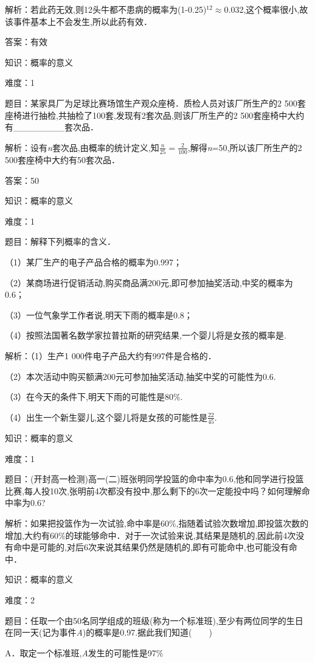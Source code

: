\documentclass{article} %
\begin{document}
解析：若此药无效,则12头牛都不患病的概率为(1-0.25)${}^{12}$$\mathrm{\approx}$0.032,这个概率很小,故该事件基本上不会发生,所以此药有效．

答案：有效

知识：概率的意义

难度：1

题目：某家具厂为足球比赛场馆生产观众座椅．质检人员对该厂所生产的2 500套座椅进行抽检,共抽检了100套,发现有2套次品,则该厂所生产的2 500套座椅中大约有\_\_\_\_\_\_\_\_套次品．

解析：设有\textit{n}套次品,由概率的统计定义,知$\frac{n}{25}=\frac{2}{100}$,解得\textit{n}=50,所以该厂所生产的2 500套座椅中大约有50套次品．

答案：50

知识：概率的意义

难度：1

题目：解释下列概率的含义．

（1）某厂生产的电子产品合格的概率为0.997；

（2）某商场进行促销活动,购买商品满200元,即可参加抽奖活动,中奖的概率为0.6；

（3）一位气象学工作者说,明天下雨的概率是0.8；

（4）按照法国著名数学家拉普拉斯的研究结果,一个婴儿将是女孩的概率是.

解析：（1）生产1 000件电子产品大约有997件是合格的．

（2）本次活动中购买额满200元可参加抽奖活动,抽奖中奖的可能性为0.6.

（3）在今天的条件下,明天下雨的可能性是80\%.

（4）出生一个新生婴儿,这个婴儿将是女孩的可能性是$\frac{22}{45}$.

知识：概率的意义

难度：1

题目：(开封高一检测)高一(二)班张明同学投篮的命中率为0.6,他和同学进行投篮比赛,每人投10次,张明前4次都没有投中,那么剩下的6次一定能投中吗？如何理解命中率为0.6?

解析：如果把投篮作为一次试验,命中率是60\%,指随着试验次数增加,即投篮次数的增加,大约有60\%的球能够命中．对于一次试验来说,其结果是随机的,因此前4次没有命中是可能的,对后6次来说其结果仍然是随机的,即有可能命中,也可能没有命中．

知识：概率的意义

难度：2

题目：任取一个由50名同学组成的班级(称为一个标准班),至少有两位同学的生日在同一天(记为事件\textit{A})的概率是0.97.据此我们知道(　　)

A．取定一个标准班,\textit{A}发生的可能性是97\%
\end{document}
